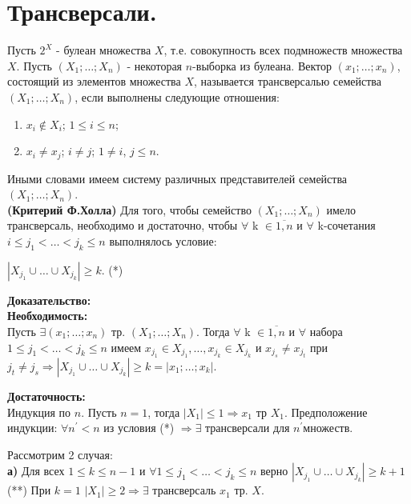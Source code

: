 \section{Трансверсали.}

\opri Пусть $2^{X}$ - булеан множества $X$, т.е. совокупность всех подмножеств множества $X$. Пусть $(X_1; \dots; X_n)$ - некоторая $n$-выборка из булеана. Вектор $(x_1; \dots; x_n)$, состоящий из элементов множества $X$, называется трансверсалью семейства $(X_1; \dots; X_n)$, если выполнены следующие отношения:

\begin{enumerate}
\item $x_i \notin X_i$; $1 \leq i \leq n$;
\item $x_i \neq x_j$; $i \neq j$; $1 \neq i$, $j \leq n$.
\end{enumerate}

Иными словами имеем систему различных представителей семейства $(X_1; \dots; X_n)$.\\

\thr \textbf{(Критерий Ф.Холла)}
Для того, чтобы семейство $(X_1; \dots; X_n)$ имело трансверсаль, необходимо и достаточно, чтобы $\forall$ k $\in \overline{1,n}$ и $\forall$ k-сочетания $i \leq j_1 < \dots < j_k \leq n$ выполнялось условие:

\begin{center}
$|X_{j_1} \cup \dots \cup X_{j_k}|\geq k$. (*)
\end{center}

\textbf{Доказательство:}\\

\textbf{Необходимость:}\\
Пусть $\exists (x_1; \dots; x_n)$ тр. $ (X_1; \dots; X_n)$. Тогда $ \forall$ k $\in \overline{1,n}$ и $\forall$ набора $1 \leq j_1 < \dots < j_k\leq n$ имеем $x_{j_1} \in X_{j_1}, \dots, x_{j_k} \in X_{j_k}$ и $x_{j_s} \neq x_{j_t}$ при $j_t \neq j_s \Rightarrow |X_{j_1} \cup \dots \cup X_{j_k}| \geq k = |{x_1; \dots; x_k}|$.

\textbf{Достаточность:}\\
Индукция по $n$. Пусть $n=1$, тогда
$|X_1| \leq 1 \Rightarrow {x_1}$ тр $X_1$.
Предположение индукции: $\forall n^' < n$ из условия (*) $\Rightarrow \exists$ трансверсали для $n^'$множеств. 

Рассмотрим 2 случая:\\

\textbf{а)} Для всех $1 \leq k \leq n-1$ и $\forall 1 \leq j_1 < \dots < j_k \leq n$ верно $|X_{j_1} \cup \dots \cup X_{j_k}| \geq k+1$ (**)
При $k=1$ $|X_1| \geq 2 \Rightarrow \exists$ трансверсаль $x_1$ тр. $X$.

